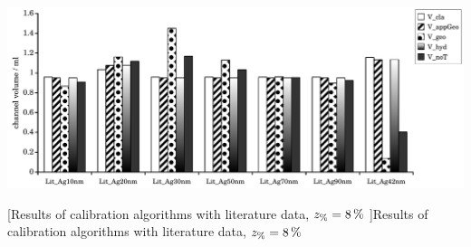 \begin{minipage}{\linewidth}
\begin{minipage}{.75\linewidth}
    \end{minipage}\\
    \begin{minipage}{.75\linewidth}
      \includegraphics[width=\linewidth]{./images/data/eval_lit_p8/Lit2Data_V_8p.pdf}

    \end{minipage}
  [Results of calibration algorithms with literature data, $z_\text{\%} = \SI{8}{\percent}$
  ]{Results of calibration algorithms with literature data, $z_\text{\%} = \SI{8}{\percent}$}
  \label{fig:LitDataResults_p8}
\end{minipage}
\clearpage
